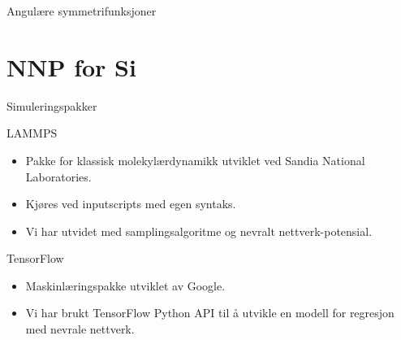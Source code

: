 \documentclass{beamer}
\begin{document}
\begin{frame}{Angulære symmetrifunksjoner}
\end{frame}

\section{NNP for Si}


\begin{frame}{Simuleringspakker}

\begin{block}{LAMMPS}
 \begin{itemize}
  \item Pakke for klassisk molekylærdynamikk utviklet ved Sandia National Laboratories. 
  \item Kjøres ved inputscripts med egen syntaks. 
  \item Vi har utvidet med samplingsalgoritme og nevralt nettverk-potensial.
 \end{itemize}
\end{block}

\begin{block}{TensorFlow}
 \begin{itemize}
  \item Maskinlæringspakke utviklet av Google. 
  \item Vi har brukt TensorFlow Python API til å utvikle en modell for regresjon med nevrale nettverk. 
 \end{itemize}
\end{block}

\end{frame}
\end{document}
